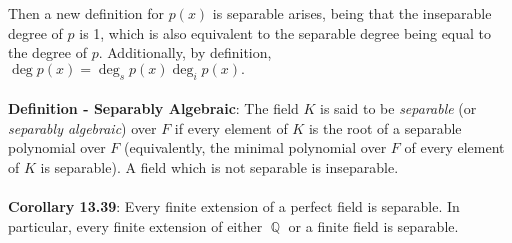 \documentclass{article}
\DeclareMathOperator{\Q}{\mathbb{Q}}
\begin{document}
Then a new definition for $p(x)$ is separable arises, being that the inseparable degree of $p$ is 1, which is also equivalent to the separable degree being equal to the degree of $p$. Additionally, by definition, $\deg p(x) = \deg_s p(x) \deg_i p(x).$ \\ \\
\textbf{Definition - Separably Algebraic}: The field $K$ is said to be \textit{separable} (or \textit{separably algebraic}) over $F$ if every element of $K$ is the root of a separable polynomial over $F$ (equivalently, the minimal polynomial over $F$ of every element of $K$ is separable). A field which is not separable is inseparable. \\ \\
\textbf{Corollary 13.39}: Every finite extension of a perfect field is separable. In particular, every finite extension of either $\Q$ or a finite field is separable.
\end{document}
